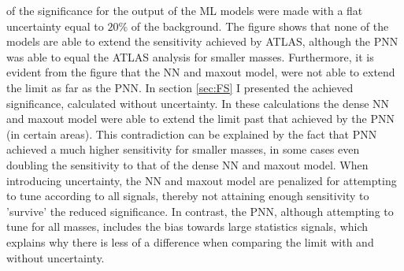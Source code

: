 of the significance for the output of the \ac{ML} models were made with a flat uncertainty equal to $20\%$ of the background.
The figure shows that none of the models are able to extend the sensitivity achieved by \ac{ATLAS}, although the \ac{PNN} was able to equal
the \ac{ATLAS} analysis for smaller masses. Furthermore, it is evident from the figure that the \ac{NN} and maxout model, were not able to 
extend the limit as far as the \ac{PNN}. In section \ref{sec:FS} I presented the achieved significance, calculated without uncertainty. In these
calculations the dense \ac{NN} and maxout model were able to extend the limit past that achieved by the \ac{PNN} (in certain areas). 
This contradiction can be explained by the fact that \ac{PNN} achieved a much higher sensitivity for smaller masses, in some cases even 
doubling the sensitivity to that of the dense \ac{NN} and maxout model. When introducing uncertainty, the \ac{NN} and maxout model are 
penalized for attempting to tune according to all signals, thereby not attaining enough sensitivity to 'survive' the reduced significance. 
In contrast, the \ac{PNN}, although attempting to tune for all masses, includes the bias towards large statistics signals, which explains why there 
is less of a difference when comparing the limit with and without uncertainty.\\

